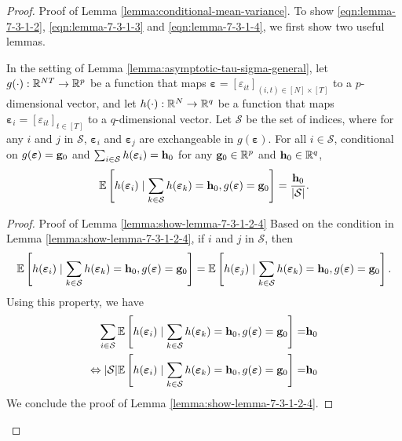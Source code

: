 \begin{proof}{Proof of Lemma \ref{lemma:conditional-mean-variance}.}
To show \eqref{eqn:lemma-7-3-1-2}, \eqref{eqn:lemma-7-3-1-3} and \eqref{eqn:lemma-7-3-1-4}, we first show two useful lemmas.

\begin{lemma}\label{lemma:show-lemma-7-3-1-2-4}
    In the setting of Lemma \ref{lemma:asymptotic-tau-sigma-general}, let $g(\cdot) : \mathbb{R}^{NT} \rightarrow \mathbb{R}^p$ be a function that maps $\bm{\varepsilon} = [\varepsilon_{it}]_{(i,t) \in [N] \times [T]}$ to a $p$-dimensional vector, and let $h(\cdot) : \mathbb{R}^{N} \rightarrow \mathbb{R}^q$ be a function that maps $\bm{\varepsilon}_i = [\varepsilon_{it}]_{t \in  [T]}$ to a $q$-dimensional vector. Let $\mathcal{S}$ be the set of indices, where for any $i$ and $j$ in $\mathcal{S}$, $\bm{\varepsilon}_i $ and $\bm{\varepsilon}_j $ are exchangeable in $g(\bm{\varepsilon})$. For all $i \in \mathcal{S}$, conditional on $g(\bm{\varepsilon}) = \mathbf{g}_0$ and $\sum_{i \in \mathcal{S}} h(\bm{\varepsilon}_i) = \mathbf{h}_0$ for any $\mathbf{g}_0 \in \mathbb{R}^p$ and $\mathbf{h}_0 \in \mathbb{R}^q$,
    \begin{align}
        \mathbb{E}\left[h(\bm{\varepsilon}_i) \mid  \sum_{k \in \mathcal{S}} h(\bm{\varepsilon}_k) = \mathbf{h}_0, g(\bm{\varepsilon}) = \mathbf{g}_0  \right] = \frac{\mathbf{h}_0}{|\mathcal{S}|}.
    \end{align}
\end{lemma}

\begin{proof}{Proof of Lemma \ref{lemma:show-lemma-7-3-1-2-4}}
    Based on the condition in Lemma \ref{lemma:show-lemma-7-3-1-2-4}, if $i$ and $j$ in $\mathcal{S}$, then 
    \[  \mathbb{E}\left[h(\bm{\varepsilon}_i) \mid  \sum_{k \in \mathcal{S}} h(\bm{\varepsilon}_k) = \mathbf{h}_0, g(\bm{\varepsilon}) = \mathbf{g}_0  \right]  =  \mathbb{E}\left[h(\bm{\varepsilon}_j) \mid  \sum_{k \in \mathcal{S}} h(\bm{\varepsilon}_k) = \mathbf{h}_0, g(\bm{\varepsilon}) = \mathbf{g}_0  \right]. \]
    Using this property, we have 
    \begin{align*}
        \sum_{i \in \mathcal{S}}  \mathbb{E}\left[h(\bm{\varepsilon}_i) \mid  \sum_{k \in \mathcal{S}} h(\bm{\varepsilon}_k) = \mathbf{h}_0, g(\bm{\varepsilon}) = \mathbf{g}_0  \right] =& \mathbf{h}_0 \\
        \Leftrightarrow	 |\mathcal{S}| \mathbb{E}\left[h(\bm{\varepsilon}_i) \mid  \sum_{k \in \mathcal{S}} h(\bm{\varepsilon}_k) = \mathbf{h}_0, g(\bm{\varepsilon}) = \mathbf{g}_0  \right] =& \mathbf{h}_0
    \end{align*}
    We conclude the proof of Lemma \ref{lemma:show-lemma-7-3-1-2-4}. \halmos
\end{proof}


\end{proof}
